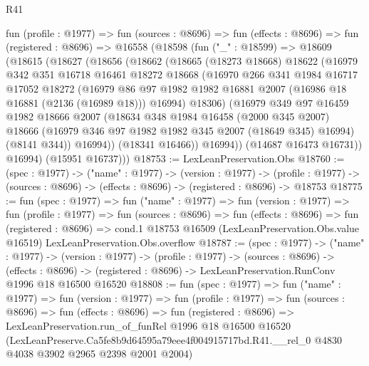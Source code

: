 \begin{lexlean}{R41}
\begin{coremodule}
  fun (profile : @1977) =>
  fun (sources : @8696) =>
  fun (effects : @8696) =>
  fun (registered : @8696) =>
  @16558
    (@18598
      (fun ("_" : @18599) =>
      @18609
        (@18615
          (@18627
            (@18656
              (@18662
                (@18665
                  (@18273 @18668)
                  @18622
                  (@16979
                    @342
                    @351
                    @16718
                    @16461
                    @18272
                    @18668
                    (@16970
                      @266
                      @341
                      @1984
                      @16717
                      @17052
                      @18272
                      (@16979
                        @86
                        @97
                        @1982
                        @1982
                        @16881
                        @2007
                        (@16986 @18 @16881 (@2136 (@16989 @18)))
                        @16994)
                      @18306)
                    (@16979
                      @349
                      @97
                      @16459
                      @1982
                      @18666
                      @2007
                      (@18634
                        @348
                        @1984
                        @16458
                        (@2000 @345 @2007)
                        @18666
                        (@16979 @346 @97 @1982 @1982 @345 @2007 (@18649 @345) @16994)
                        (@8141 @344))
                      @16994))
                  (@18341 @16466))
                @16994))
            (@14687 @16473 @16731))
          @16994)
        (@15951 @16737)))
@18753 := LexLeanPreservation.Obs
@18760 := (spec : @1977) ->
  ("name" : @1977) ->
  (version : @1977) ->
  (profile : @1977) -> (sources : @8696) -> (effects : @8696) -> (registered : @8696) -> @18753
@18775 := fun (spec : @1977) =>
  fun ("name" : @1977) =>
  fun (version : @1977) =>
  fun (profile : @1977) =>
  fun (sources : @8696) =>
  fun (effects : @8696) =>
  fun (registered : @8696) =>
  cond.{1} @18753 @16509 (LexLeanPreservation.Obs.value @16519) LexLeanPreservation.Obs.overflow
@18787 := (spec : @1977) ->
  ("name" : @1977) ->
  (version : @1977) ->
  (profile : @1977) ->
  (sources : @8696) ->
  (effects : @8696) -> (registered : @8696) -> LexLeanPreservation.RunConv @1996 @18 @16500 @16520
@18808 := fun (spec : @1977) =>
  fun ("name" : @1977) =>
  fun (version : @1977) =>
  fun (profile : @1977) =>
  fun (sources : @8696) =>
  fun (effects : @8696) =>
  fun (registered : @8696) =>
  LexLeanPreservation.run_of_funRel
    @1996
    @18
    @16500
    @16520
    (LexLeanPreserve.Ca5fe8b9d64595a79eee4f004915717bd.R41.__rel_0
      @4830
      @4038
      @3902
      @2965
      @2398
      @2001
      @2004)
\end{coremodule}
\end{lexlean}
